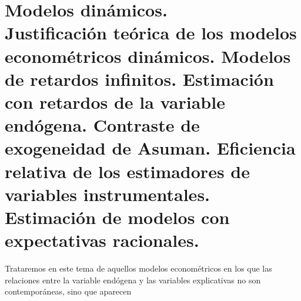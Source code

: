 \chapter[Modelos din\'amicos.]{Modelos din\'amicos. \\
\normalsize  Justificaci\'on te\'orica de los modelos econom\'etricos
din\'amicos. Modelos de retardos infinitos. Estimaci\'on con retardos
de la variable end\'ogena. Contraste de exogeneidad de Asuman. Eficiencia
relativa de los estimadores de variables instrumentales. Estimaci\'on
de modelos con expectativas racionales.}




Trataremos en este tema de aquellos modelos econom\'etricos en los que
las relaciones entre la variable end\'ogena y las variables explicativas
no son contempor\'aneas, sino que aparecen


